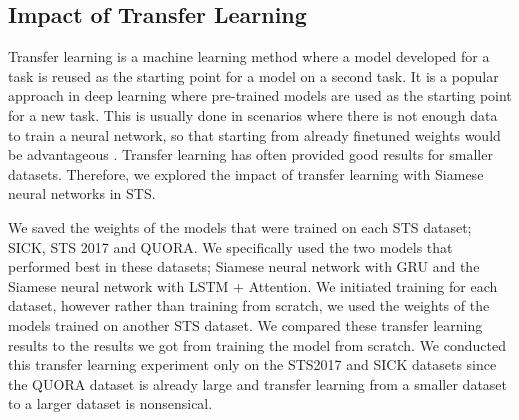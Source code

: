 \subsection{Impact of Transfer Learning}
\label{sec:siamese_transfer}
Transfer learning is a machine learning method where a model developed for a task is reused as the starting point for a model on a second task. It is a popular approach in deep learning where pre-trained models are used as the starting point for a new task. This is usually done in scenarios where there is not enough data to train a neural network, so that starting from already finetuned weights would be advantageous \autocite{pmlr-v97-houlsby19a, ruder-etal-2019-transfer}. Transfer learning has often provided good results for smaller datasets. Therefore, we explored the impact of transfer learning with Siamese neural networks in STS.

We saved the weights of the models that were trained on each STS dataset; SICK, STS 2017 and QUORA. We specifically used the two models that performed best in these datasets; Siamese neural network with GRU and the Siamese neural network with LSTM + Attention. We initiated training for each dataset, however rather than training from scratch, we used the weights of the models trained on another STS dataset. We compared these transfer learning results to the results we got from training the model from scratch. We conducted this transfer learning experiment only on the STS2017 and SICK datasets since the QUORA dataset is already large and transfer learning from a smaller dataset to a larger dataset is nonsensical.


